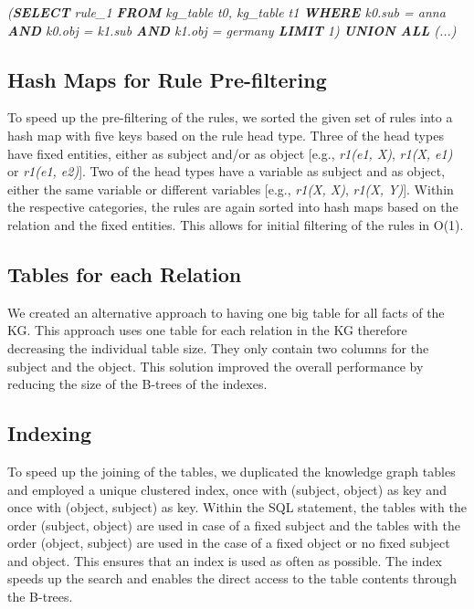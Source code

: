 \documentclass[english]{lni}
\begin{document}
\textit{(\textbf{SELECT} rule\_1 \textbf{FROM} kg\_table t0,  kg\_table t1 \textbf{WHERE} k0.sub = anna \textbf{AND} k0.obj = k1.sub \textbf{AND} k1.obj = germany \textbf{LIMIT} 1)  \textbf{UNION ALL} (...)}


\subsection{Hash Maps for Rule Pre-filtering} 
To speed up the pre-filtering of the rules, we sorted the given set of rules into a hash map with five keys based on the rule head type. Three of the head types have fixed entities, either as subject and/or as object [e.g., \textit{r1(e1, X)}, \textit{r1(X, e1)} or \textit{r1(e1, e2)}]. Two of the head types have a variable as subject and as object, either the same variable or different variables [e.g., \textit{r1(X, X)}, \textit{r1(X, Y)}]. Within the respective categories, the rules are again sorted into hash maps based on the relation and the fixed entities. This allows for initial filtering of the rules in O(1).

\subsection{Tables for each Relation}
We created an alternative approach to having one big table for all facts of the KG. This approach uses one table for each relation in the KG therefore decreasing the individual table size. They only contain two columns for the subject and the object. This solution improved the overall performance by reducing the size of the B-trees of the indexes.

\subsection{Indexing}
To speed up the joining of the tables, we duplicated the knowledge graph tables and employed a unique clustered index, once with (subject, object) as key and once with (object, subject) as key. Within the SQL statement, the tables with the order (subject, object) are used in case of a fixed subject and the tables with the order (object, subject) are used in the case of a fixed object or no fixed subject and object. This ensures that an index is used as often as possible. The index speeds up the search and enables the direct access to the table contents through the B-trees.
\end{document}
